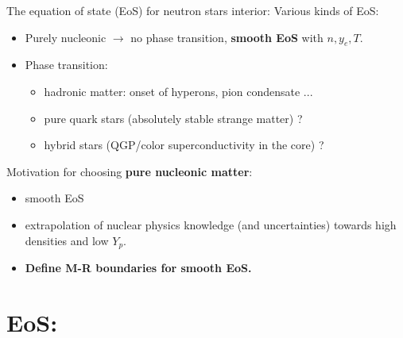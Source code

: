 \documentclass[francais]{beamer}
\begin{document}
\begin{frame}{The equation of state (EoS) for neutron stars interior:}
Various kinds of EoS:
\vspace{+0.5cm}
\begin{itemize}
\color{white}
	\item Purely nucleonic $\rightarrow$ no phase transition, \textbf{smooth EoS} with $n , y_e,T$.
	\item Phase transition:
		\begin{itemize}
		\color{white}
			\item hadronic matter: onset of hyperons, pion condensate ...
			\item pure quark stars (absolutely stable strange matter) ? 
			\item hybrid stars (QGP/color superconductivity in the core) ?
		\end{itemize}			
	\vspace{+0.5cm}
\end{itemize}
Motivation for choosing \textbf{pure nucleonic matter}:
\begin{itemize}
\color{white}
	\vspace{+0.5cm}
	\item smooth EoS
	\item extrapolation of nuclear physics knowledge (and uncertainties) towards high densities and low $Y_p$.
	\item \textbf{ Define M-R boundaries for smooth EoS.}
\end{itemize}
\end{frame}



\section{EoS:}
\end{document}
